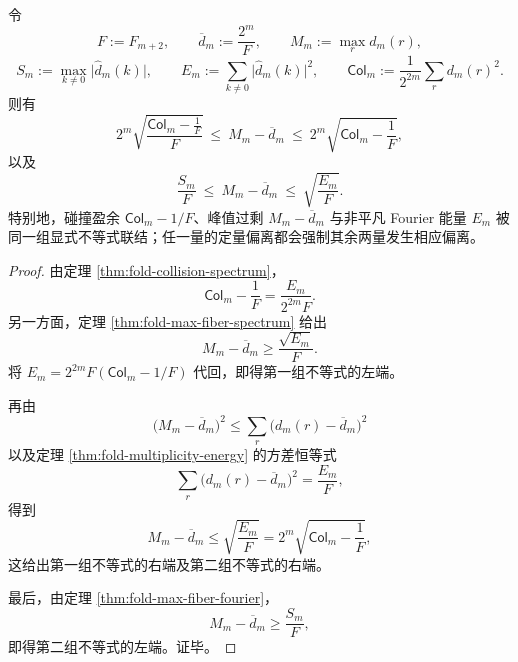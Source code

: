 \begin{conclusion}\label{con:xi-time-part9m-collision-peak-fourier-sandwich}
令
\[
F:=F_{m+2},
\qquad
\overline d_m:=\frac{2^m}{F},
\qquad
M_m:=\max_{r}d_m(r),
\]
\[
S_m:=\max_{k\ne 0}\bigl|\widehat d_m(k)\bigr|,
\qquad
E_m:=\sum_{k\ne 0}\bigl|\widehat d_m(k)\bigr|^2,
\qquad
\mathsf{Col}_m:=\frac{1}{2^{2m}}\sum_r d_m(r)^2.
\]
则有
\[
2^m\sqrt{\frac{\mathsf{Col}_m-\frac1F}{F}}
\ \le\
M_m-\overline d_m
\ \le\
2^m\sqrt{\mathsf{Col}_m-\frac1F},
\]
以及
\[
\frac{S_m}{F}
\ \le\
M_m-\overline d_m
\ \le\
\sqrt{\frac{E_m}{F}}.
\]
特别地，碰撞盈余 \(\mathsf{Col}_m-1/F\)、峰值过剩 \(M_m-\overline d_m\) 与非平凡 Fourier 能量 \(E_m\) 被同一组显式不等式联结；任一量的定量偏离都会强制其余两量发生相应偏离。
\end{conclusion}
\begin{proof}
由定理 \ref{thm:fold-collision-spectrum}，
\[
\mathsf{Col}_m-\frac1F=\frac{E_m}{2^{2m}F}.
\]
另一方面，定理 \ref{thm:fold-max-fiber-spectrum} 给出
\[
M_m-\overline d_m\ge \frac{\sqrt{E_m}}{F}.
\]
将 \(E_m=2^{2m}F(\mathsf{Col}_m-1/F)\) 代回，即得第一组不等式的左端。

再由
\[
\bigl(M_m-\overline d_m\bigr)^2
\le
\sum_r\bigl(d_m(r)-\overline d_m\bigr)^2
\]
以及定理 \ref{thm:fold-multiplicity-energy} 的方差恒等式
\[
\sum_r\bigl(d_m(r)-\overline d_m\bigr)^2=\frac{E_m}{F},
\]
得到
\[
M_m-\overline d_m\le \sqrt{\frac{E_m}{F}}
=
2^m\sqrt{\mathsf{Col}_m-\frac1F},
\]
这给出第一组不等式的右端及第二组不等式的右端。

最后，由定理 \ref{thm:fold-max-fiber-fourier}，
\[
M_m-\overline d_m\ge \frac{S_m}{F},
\]
即得第二组不等式的左端。证毕。
\end{proof}

